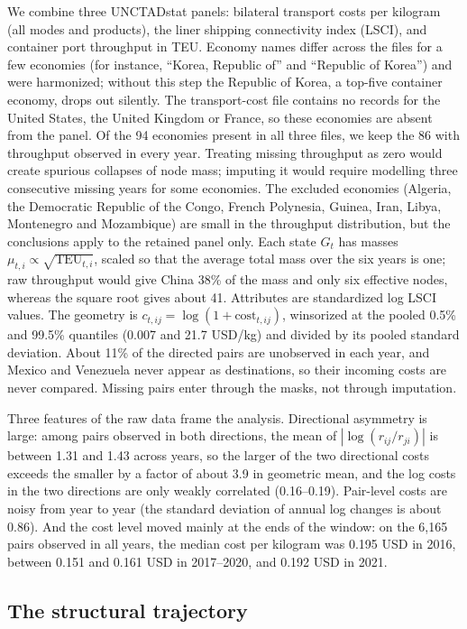 \documentclass[12pt]{article}
\theoremstyle{definition}
\begin{document}
We combine three UNCTADstat panels: bilateral transport costs per kilogram (all modes and products), the liner shipping connectivity index (LSCI), and container port throughput in TEU. Economy names differ across the files for a few economies (for instance, ``Korea, Republic of'' and ``Republic of Korea'') and were harmonized; without this step the Republic of Korea, a top-five container economy, drops out silently. The transport-cost file contains no records for the United States, the United Kingdom or France, so these economies are absent from the panel. Of the 94 economies present in all three files, we keep the 86 with throughput observed in every year. Treating missing throughput as zero would create spurious collapses of node mass; imputing it would require modelling three consecutive missing years for some economies. The excluded economies (Algeria, the Democratic Republic of the Congo, French Polynesia, Guinea, Iran, Libya, Montenegro and Mozambique) are small in the throughput distribution, but the conclusions apply to the retained panel only. Each state $G_t$ has masses $\mu_{t,i}\propto\sqrt{\mathrm{TEU}_{t,i}}$, scaled so that the average total mass over the six years is one; raw throughput would give China 38\% of the mass and only six effective nodes, whereas the square root gives about 41. Attributes are standardized log LSCI values. The geometry is $c_{t,ij}=\log(1+\text{cost}_{t,ij})$, winsorized at the pooled 0.5\% and 99.5\% quantiles (0.007 and 21.7 USD/kg) and divided by its pooled standard deviation. About 11\% of the directed pairs are unobserved in each year, and Mexico and Venezuela never appear as destinations, so their incoming costs are never compared. Missing pairs enter through the masks, not through imputation.

Three features of the raw data frame the analysis. Directional asymmetry is large: among pairs observed in both directions, the mean of $|\log(r_{ij}/r_{ji})|$ is between 1.31 and 1.43 across years, so the larger of the two directional costs exceeds the smaller by a factor of about 3.9 in geometric mean, and the log costs in the two directions are only weakly correlated (0.16--0.19). Pair-level costs are noisy from year to year (the standard deviation of annual log changes is about 0.86). And the cost level moved mainly at the ends of the window: on the 6{,}165 pairs observed in all years, the median cost per kilogram was 0.195 USD in 2016, between 0.151 and 0.161 USD in 2017--2020, and 0.192 USD in 2021.

\subsection{The structural trajectory}
\end{document}
